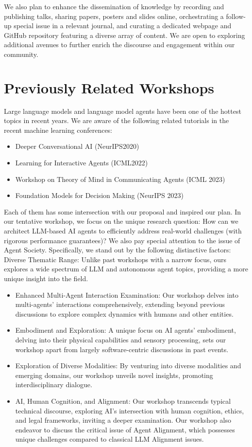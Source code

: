 \documentclass[10pt]{article} %
\newcounter{exa}
\begin{document}
We also plan to enhance the dissemination of knowledge by recording and publishing talks, sharing papers, posters and slides online, orchestrating a follow-up special issue in a relevant journal, and curating a dedicated webpage and GitHub repository featuring a diverse array of content. We are open to exploring additional avenues to further enrich the discourse and engagement within our community.

\section{Previously Related Workshops}
Large language models and language model agents have been one of the hottest topics in recent years. We are aware of the following related tutorials in the recent machine learning conferences:
\begin{itemize}
    \item Deeper Conversational AI (NeurIPS2020)
    \item Learning for Interactive Agents (ICML2022)
    \item Workshop on Theory of Mind in Communicating Agents (ICML 2023)
    \item Foundation Models for Decision Making (NeurIPS 2023)
\end{itemize}

Each of them has some intersection with our proposal and inspired our plan. In our tentative workshop, we focus on the unique research question: How can we architect LLM-based AI agents to efficiently address real-world challenges (with rigorous performance guarantees)? We also pay special attention to the issue of Agent Society. Specifically, we stand out by the following distinctive factors:
Diverse Thematic Range: Unlike past workshops with a narrow focus, ours explores a wide spectrum of LLM and autonomous agent topics, providing a more unique insight into the field.

\begin{itemize}
    \item Enhanced Multi-Agent Interaction Examination: Our workshop delves into multi-agents' interactions comprehensively, extending beyond previous discussions to explore complex dynamics with humans and other entities.
    \item Embodiment and Exploration: A unique focus on AI agents’ embodiment, delving into their physical capabilities and sensory processing, sets our workshop apart from largely software-centric discussions in past events.
    \item Exploration of Diverse Modalities: By venturing into diverse modalities and emerging domains, our workshop unveils novel insights, promoting interdisciplinary dialogue.
    \item AI, Human Cognition, and Alignment: Our workshop transcends typical technical discourse, exploring AI's intersection with human cognition, ethics, and legal frameworks, inviting a deeper examination. Our workshop also endeavor to discuss the critical issue of Agent Alignment, which possesses unique challenges compared to classical LLM Alignment issues.
\end{itemize}
\end{document}
